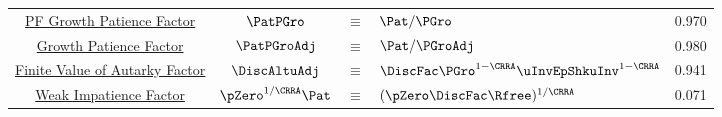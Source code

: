 \begin{table}
{\begin{tabular}{|c|ccl|c|}
\href{https://\owner.github.io/BufferStockTheory\#PFGPF}{PF Growth Patience Factor}    & $\PatPGro$ & $\equiv$ & $\Pat/\PGro $      & 0.970 \\
\href{https://\owner.github.io/BufferStockTheory\#GPF}{\phantom{PF~} Growth Patience Factor}                      & $\PatPGroAdj$ & $\equiv$ & $ \Pat/\PGroAdj$& 0.980 \\
\href{https://\owner.github.io/BufferStockTheory\#FVAF}{Finite Value of Autarky Factor}         & $\DiscAltuAdj $ & $\equiv$ & $ \DiscFac \PGro^{1-\CRRA}\uInvEpShkuInv^{1-\CRRA}$       & 0.941 \\
\href{https://\owner.github.io/BufferStockTheory\#WRICCond}{Weak Impatience Factor}         & $\pZero^{1/\CRRA} \Pat $ & $\equiv$ & $ (\pZero \DiscFac \Rfree)^{1/\CRRA}$       & 0.071 \\ \hline
\end{tabular}
} %
\settowidth\TableWidth{\usebox{\Calibration}}
\usebox{\Calibration}

\end{table}
